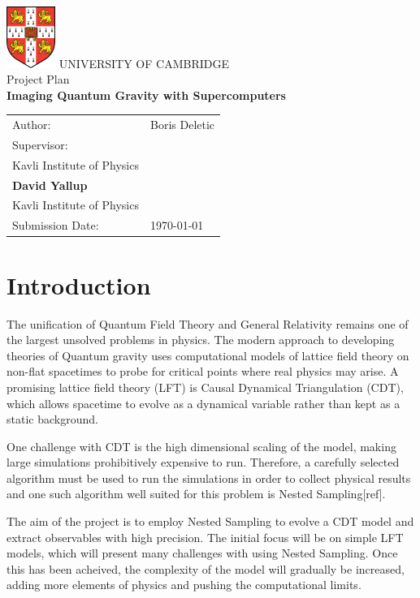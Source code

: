 \documentclass[draft]{article}
\newcommand{\getAuthor}{Boris Deletic}
\newcommand{\getDoctype}{Project Plan}
\newcommand{\getTitle}{Imaging Quantum Gravity with Supercomputers}
\newcommand{\getUniversity}{University of Cambridge}
\newcommand{\getSupervisor}{\textbf{Will Barker}\\
Kavli Institute of Physics\\[1em] 
\textbf{David Yallup}\\ 
Kavli Institute of Physics}
\newcommand{\getSubmissionDate}{\today}
\begin{document}
\begin{titlepage} 
    \centering 
    \includegraphics[height=20mm]{logo.png} {%
    \vspace*{20mm} }
    \vspace{5mm}
    {\large\MakeUppercase{\getUniversity{}}}\\ 
    \vspace{20mm}
    {\Large \getDoctype{}}\\
    \vspace{15mm}
    {\huge\bfseries \getTitle{}}\\
    \vspace{15mm} 
    \begin{tabular}{l l} 
        Author: & \getAuthor{} \\[1em] 
        Supervisor: & \pbox[t]{5cm}{\getSupervisor{}} \\ 
        Submission Date: & \getSubmissionDate{} \\
    \end{tabular} 
  \end{titlepage}

  \section{Introduction}
        The unification of Quantum Field Theory and General Relativity remains one of the largest unsolved problems in physics. The modern approach to developing theories of Quantum gravity uses computational models of lattice field theory on non-flat spacetimes to probe for critical points where real physics may arise. A promising lattice field theory (LFT) is Causal Dynamical Triangulation (CDT), which allows spacetime to evolve as a dynamical variable rather than kept as a static background.

    One challenge with CDT is the high dimensional scaling of the model, making large simulations prohibitively expensive to run. Therefore, a carefully selected algorithm must be used to run the simulations in order to collect physical results and one such algorithm well suited for this problem is Nested Sampling[ref].

    The aim of the project is to employ Nested Sampling to evolve a CDT model and extract observables with high precision. The initial focus will be on simple LFT models, which will present many challenges with using Nested Sampling. Once this has been acheived, the complexity of the model will gradually be increased, adding more elements of physics and pushing the computational limits.
\end{document}
